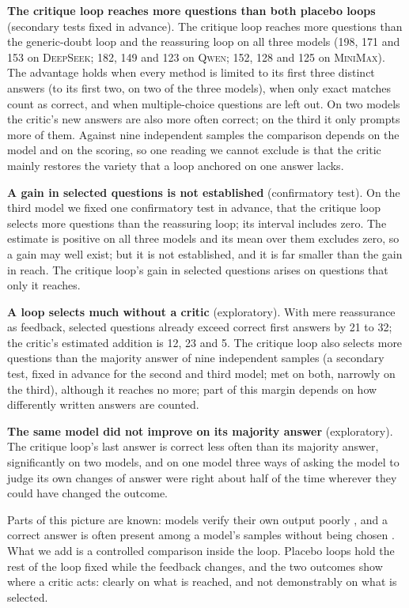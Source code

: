 \documentclass[11pt]{article}
\newcommand{\ds}{\textsc{DeepSeek}}
\newcommand{\qw}{\textsc{Qwen}}
\newcommand{\mm}{\textsc{MiniMax}}
\begin{document}
\textbf{The critique loop reaches more questions than both placebo loops} (secondary tests fixed in advance).
The critique loop reaches more questions than the generic-doubt loop and the reassuring loop on all three models (198, 171 and 153 on \ds; 182, 149 and 123 on \qw; 152, 128 and 125 on \mm).
The advantage holds when every method is limited to its first three distinct answers (to its first two, on two of the three models), when only exact matches count as correct, and when multiple-choice questions are left out.
On two models the critic's new answers are also more often correct; on the third it only prompts more of them.
Against nine independent samples the comparison depends on the model and on the scoring, so one reading we cannot exclude is that the critic mainly restores the variety that a loop anchored on one answer lacks.

\textbf{A gain in selected questions is not established} (confirmatory test).
On the third model we fixed one confirmatory test in advance, that the critique loop selects more questions than the reassuring loop; its interval includes zero.
The estimate is positive on all three models and its mean over them excludes zero, so a gain may well exist; but it is not established, and it is far smaller than the gain in reach.
The critique loop's gain in selected questions arises on questions that only it reaches.

\textbf{A loop selects much without a critic} (exploratory).
With mere reassurance as feedback, selected questions already exceed correct first answers by 21 to 32; the critic's estimated addition is 12, 23 and 5.
The critique loop also selects more questions than the majority answer of nine independent samples (a secondary test, fixed in advance for the second and third model; met on both, narrowly on the third), although it reaches no more; part of this margin depends on how differently written answers are counted.

\textbf{The same model did not improve on its majority answer} (exploratory).
The critique loop's last answer is correct less often than its majority answer, significantly on two models, and on one model three ways of asking the model to judge its own changes of answer were right about half of the time wherever they could have changed the outcome.

Parts of this picture are known: models verify their own output poorly \citep{huang2024cannot,stechly2024selfverification,song2024mindgap}, and a correct answer is often present among a model's samples without being chosen \citep{brown2024monkeys,jain2026cliff}.
What we add is a controlled comparison inside the loop.
Placebo loops hold the rest of the loop fixed while the feedback changes, and the two outcomes show where a critic acts: clearly on what is reached, and not demonstrably on what is selected.
\end{document}
